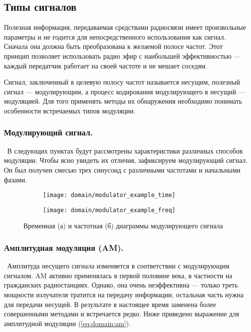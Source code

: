 \subsection{Типы сигналов}

Полезная информация, передаваемая средствами радиосвязи имеет произвольные параметры и не годится для непосредственного использования как сигнал. Сначала она должна быть преобразована к желаемой полосе частот. Этот принцип позволяет использовать радио эфир с наибольшей эффективностью --- каждый передатчик работает на своей частоте и не мешает соседям.

Сигнал, заключенный в целевую полосу частот называется несущим, полезный сигнал --- модулирующим, а процесс кодирования модулирующего в несущий --- модуляцией. Для того применять методы их обнаружения необходимо понимать особенности встречаемых типов модуляции.


\subsubsection{Модулирующий сигнал.}\ В следующих пунктах будут рассмотрены характеристики различных способов модуляции. Чтобы ясно увидеть их отличия, зафиксируем модулирующий сигнал. Он был получен смесью трех синусоид с различными частотами и начальными фазами.

\begin{figure}[h]
  \centering
  \begin{subfigure}{0.45\textwidth}
    \texttt{[image: domain/modulator\_example\_time]}
    \caption{}
  \end{subfigure}
  \begin{subfigure}{0.45\textwidth}
    \texttt{[image: domain/modulator\_example\_freq]}
    \caption{}
  \end{subfigure}
  \caption{Временная (а) и частотная (б) диаграммы модулирующего сигнала}
  \label{fig:domain:modulator}
\end{figure}

\subsubsection{Амплитудная модуляция (AM).}\ Амплитуда несущего сигнала изменяется в соответствии с модулирующим сигналом. AM активно применялась в первой половине  века, в частности на гражданских радиостанциях. Однако, она очень неэффективна --- только треть мощности излучателя тратится на передачу информации, остальная часть нужна для передачи несущей. В результате в настоящее время заменена более совершенными методами и встречается редко. Ниже приведено выражение для амплитудной модуляции (\autoref{eq:domain:am}).

